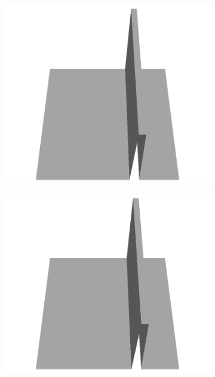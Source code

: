 \documentclass[../document.tex]{subfiles}
\begin{document}
\begin{figure}[H]
\begin{subfigure}[b]{0.065\textwidth}
    \includegraphics[width=\linewidth]{../img/5/custom_patches/walls_front/all/43-3d.png}
    \end{subfigure}
    \begin{subfigure}[b]{0.065\textwidth}
    \includegraphics[width=\linewidth]{../img/5/custom_patches/walls_front/all/42-3d.png}
    \end{subfigure}
    \begin{subfigure}[b]{0.065\textwidth}

\end{subfigure}
\end{figure}
\end{document}

